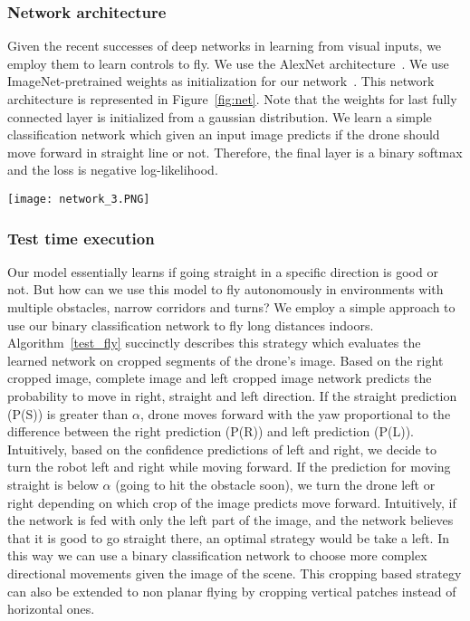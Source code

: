 \documentclass[letterpaper, 10 pt, conference]{ieeeconf}  %
\begin{document}
\subsubsection{Network architecture}
Given the recent successes of deep networks in learning from visual inputs, we employ them to learn controls to fly.  We use the AlexNet architecture~\cite{krizhevsky2012imagenet}. We use ImageNet-pretrained weights as initialization for our network~\cite{girshick2014rich}. This network architecture is represented in Figure~\ref{fig:net}. Note that the weights for last fully connected layer is initialized from a gaussian distribution. We learn a simple classification network which given an input image predicts if the drone should move forward in straight line or not. Therefore, the final layer is a binary softmax and the loss is negative log-likelihood.

\begin{figure*}[t!]
\centering
\texttt{[image: network\_3.PNG]}
\caption{We employ deep neural networks to learn how to fly. The convolutional weights of our network (in grey) are pretrained from ImageNet classification~\cite{krizhevsky2012imagenet}, while the fully connected weights (in orange) is initialized randomly and learnt entirely from the collision data. At test-time, crops of the image are given as input, and the network outputs the probability of taking control actions.
}
\label{fig:net}
\end{figure*}\subsubsection{Test time execution}
Our model essentially learns if going straight in a specific direction is good or not. But how can we use this model to fly autonomously in environments with multiple obstacles, narrow corridors and turns? We employ a simple approach to use our binary classification network to fly long distances indoors. Algorithm~\ref{test_fly} succinctly describes this strategy which evaluates the learned network on cropped segments of the drone's image. Based on the right cropped image, complete image and left cropped image network predicts the probability to move in right, straight and left direction. If the straight prediction (P(S)) is greater than  $\alpha$, drone moves forward with the yaw proportional to the difference between the right prediction (P(R)) and left prediction (P(L)). Intuitively, based on the confidence predictions of left and right, we decide to turn the robot left and right while moving forward.
If the prediction for moving straight is below $\alpha$ (going to hit the obstacle soon), we turn the drone left or right depending on which crop of the image predicts move forward.
Intuitively, if the network is fed with only the left part of the image, and the network believes that it is good to go straight there, an optimal strategy would be take a left. In this way we can use a binary classification network to choose more complex directional movements given the image of the scene. This cropping based strategy can also be extended to non planar flying by cropping vertical patches instead of horizontal ones.
\end{document}
